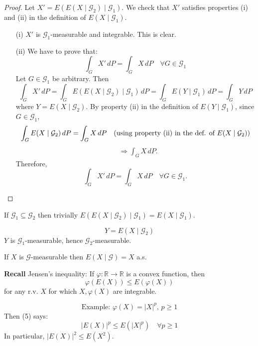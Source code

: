 \begin{proof}
    Let \( X' = E(E(X \mid \mathcal{G}_2) \mid \mathcal{G}_1) \). We check that \( X' \) satisfies properties (i) and (ii) in the definition of \( E(X \mid \mathcal{G}_1) \).

\begin{enumerate}
    \item[(i)] \( X' \) is \(\mathcal{G}_1\)-measurable and integrable. This is clear.
    \item[(ii)] We have to prove that:
    \[
    \int_G X' \, dP = \int_G X \, dP \quad \forall G \in \mathcal{G}_1
    \]
    Let \( G \in \mathcal{G}_1 \) be arbitrary. Then
    \[
    \int_G X' \, dP = \int_G E(E(X \mid \mathcal{G}_2) \mid \mathcal{G}_1) \, dP = \int_G E(Y \mid \mathcal{G}_1) \, dP = \int_G Y \, dP
    \]
    where \( Y = E(X \mid \mathcal{G}_2) \). By property (ii) in the definition of \( E(Y \mid \mathcal{G}_1) \), since \( G \in \mathcal{G}_1 \),
    \[
    \int_G E(X \mid \mathcal{G}_2) \, dP = \int_G X \, dP \quad \text{(using property (ii) in the def. of \( E(X \mid \mathcal{G}_2) \))}
    \]
    \[
    \begin{aligned}
    &\Rightarrow \int_G X \, dP.
    \end{aligned}
    \]
    Therefore,
    \[
    \int_G X' \, dP = \int_G X \, dP \quad \forall G \in \mathcal{G}_1.
    \]
\end{enumerate}

\end{proof}


If \(\mathcal{G}_1 \subseteq \mathcal{G}_2\) then trivially \( E(E(X \mid \mathcal{G}_2) \mid \mathcal{G}_1) = E(X \mid \mathcal{G}_1) \).

\[
Y = E(X \mid \mathcal{G}_2) 
\]
\( Y \) is \(\mathcal{G}_1\)-measurable, hence \(\mathcal{G}_2\)-measurable.

\begin{lemma}
    If \(X\) is \(\mathcal{G}\)-measurable then \( E(X \mid \mathcal{G}) = X \) a.s.
\end{lemma}

\textbf{Recall}
Jensen's inequality: If \( \varphi : \mathbb{R} \rightarrow \mathbb{R} \) is a convex function, then
\[
\varphi(E(X)) \leq E(\varphi(X)) \tag{5}
\]
for any r.v. \(X\) for which \(X, \varphi(X)\) are integrable.

\[
\text{Example: } \varphi(X) = |X|^p, \, p \geq 1 
\]
Then (5) says:
\[
|E(X)|^p \leq E(|X|^p) \quad \forall p \geq 1 
\]
In particular, \( |E(X)|^2 \leq E(X^2) \).

